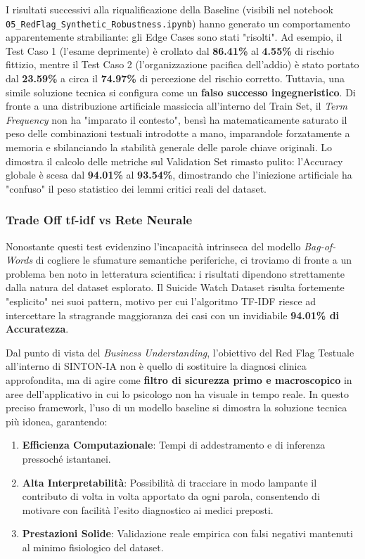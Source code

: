 I risultati successivi alla riqualificazione della Baseline (visibili nel notebook \texttt{05\_RedFlag\_Synthetic\_Robustness.ipynb}) hanno generato un comportamento apparentemente strabiliante: gli Edge Cases sono stati "risolti". Ad esempio, il Test Caso 1 (l'esame deprimente) è crollato dal \textbf{86.41\%} al \textbf{4.55\%} di rischio fittizio, mentre il Test Caso 2 (l'organizzazione pacifica dell'addio) è stato portato dal \textbf{23.59\%} a circa il \textbf{74.97\%} di percezione del rischio corretto.
Tuttavia, una simile soluzione tecnica si configura come un \textbf{falso successo ingegneristico}. Di fronte a una distribuzione artificiale massiccia all'interno del Train Set, il \textit{Term Frequency} non ha "imparato il contesto", bensì ha matematicamente saturato il peso delle combinazioni testuali introdotte a mano, imparandole forzatamente a memoria e sbilanciando la stabilità generale delle parole chiave originali. Lo dimostra il calcolo delle metriche sul Validation Set rimasto pulito: l'Accuracy globale è scesa dal \textbf{94.01\%} al \textbf{93.54\%}, dimostrando che l'iniezione artificiale ha "confuso" il peso statistico dei lemmi critici reali del dataset.

\subsubsection{Trade Off tf-idf vs Rete Neurale}
Nonostante questi test evidenzino l'incapacità intrinseca del modello \textit{Bag-of-Words} di cogliere le sfumature semantiche periferiche, ci troviamo di fronte a un problema ben noto in letteratura scientifica: i risultati dipendono strettamente dalla natura del dataset esplorato. Il Suicide Watch Dataset risulta fortemente "esplicito" nei suoi pattern, motivo per cui l'algoritmo TF-IDF riesce ad intercettare la stragrande maggioranza dei casi con un invidiabile \textbf{94.01\% di Accuratezza}.

Dal punto di vista del \textit{Business Understanding}, l'obiettivo del Red Flag Testuale all'interno di SINTON-IA non è quello di sostituire la diagnosi clinica approfondita, ma di agire come \textbf{filtro di sicurezza primo e macroscopico} in aree dell'applicativo in cui lo psicologo non ha visuale in tempo reale. In questo preciso framework, l'uso di un modello baseline si dimostra la soluzione tecnica più idonea, garantendo:
\begin{enumerate}
    \item \textbf{Efficienza Computazionale}: Tempi di addestramento e di inferenza pressoché istantanei.
    \item \textbf{Alta Interpretabilità}: Possibilità di tracciare in modo lampante il contributo di volta in volta apportato da ogni parola, consentendo di motivare con facilità l'esito diagnostico ai medici preposti.
    \item \textbf{Prestazioni Solide}: Validazione reale empirica con falsi negativi mantenuti al minimo fisiologico del dataset.
\end{enumerate}

